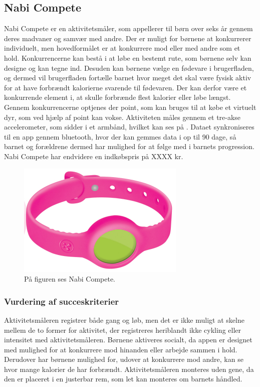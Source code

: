 \subsection{Nabi Compete}
Nabi Compete er en aktivitetsmåler, som appellerer til børn over seks år gennem deres madvaner og samvær med andre. Der er muligt for børnene at konkurrerer individuelt, men hovedformålet er at konkurrere mod eller med andre som et hold. Konkurrencerne kan bestå i at løbe en bestemt rute, som børnene selv kan designe og kan tegne ind. Desuden kan børnene vælge en fødevare i brugerfladen, og dermed vil brugerfladen fortælle barnet hvor meget det skal være fysisk aktiv for at have forbrændt kalorierne svarende til fødevaren. Der kan derfor være et konkurrende element i, at skulle forbrænde flest kalorier eller løbe længst.
Gennem konkurrencerne optjenes der point, som kan bruges til at købe et virtuelt dyr, som ved hjælp af point kan vokse. 
Aktiviteten måles gennem et tre-akse accelerometer, som sidder i et armbånd, hvilket kan ses på . Dataet synkroniseres til en app gennem bluetooth, hvor der kan gemmes data i op til 90 dage, så barnet og forældrene dermed har mulighed for at følge med i barnets progression. \citep{Fuhu_tech2015,Fuhu2015} 
Nabi Compete har endvidere en indkøbspris på XXXX kr. 
\begin{figure}[H]
	\centering
	\includegraphics[scale=0.9]{figures/aProblemanalyse/nabi.png}
	\caption{På figuren ses Nabi Compete. \citep{Perez2015}}
	\label{fig:nabi}
\end{figure}

\subsubsection{Vurdering af succeskriterier}
Aktivitetsmåleren registrer både gang og løb, men det er ikke muligt at skelne mellem de to former for aktivitet, der registreres heriblandt ikke cykling eller intensitet med aktivitetsmåleren. 
Børnene aktiveres socialt, da appen er designet med mulighed for at konkurrere mod hinanden eller arbejde sammen i hold. Derudover har børnene mulighed for, 
udover at konkurrere mod andre, kan se hvor mange kalorier de har forbrændt. Aktivitetsmåleren monteres uden gene, da den er placeret i en justerbar rem, som let kan monteres om barnets håndled.

